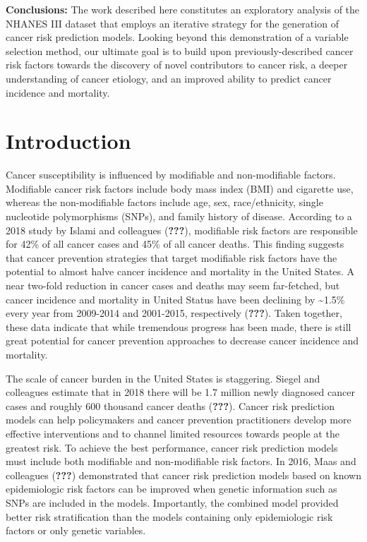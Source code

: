 \documentclass[12pt,twoside]{reedthesis}
\theoremstyle{definition}
\theoremstyle{definition}
\theoremstyle{definition}
\theoremstyle{remark}
\begin{document}
\textbf{Conclusions:} The work described here constitutes an exploratory
analysis of the NHANES III dataset that employs an iterative strategy
for the generation of cancer risk prediction models. Looking beyond this
demonstration of a variable selection method, our ultimate goal is to
build upon previously-described cancer risk factors towards the
discovery of novel contributors to cancer risk, a deeper understanding
of cancer etiology, and an improved ability to predict cancer incidence
and mortality.

\hypertarget{introduction}{%
\section{Introduction}\label{introduction}}

Cancer susceptibility is influenced by modifiable and non-modifiable
factors. Modifiable cancer risk factors include body mass index (BMI)
and cigarette use, whereas the non-modifiable factors include age, sex,
race/ethnicity, single nucleotide polymorphisms (SNPs), and family
history of disease. According to a 2018 study by Islami and colleagues
({\textbf{???}}), modifiable risk factors are responsible for 42\% of
all cancer cases and 45\% of all cancer deaths. This finding suggests
that cancer prevention strategies that target modifiable risk factors
have the potential to almost halve cancer incidence and mortality in the
United States. A near two-fold reduction in cancer cases and deaths may
seem far-fetched, but cancer incidence and mortality in United Status
have been declining by \textasciitilde{}1.5\% every year from 2009-2014
and 2001-2015, respectively ({\textbf{???}}). Taken together, these data
indicate that while tremendous progress has been made, there is still
great potential for cancer prevention approaches to decrease cancer
incidence and mortality.

The scale of cancer burden in the United States is staggering. Siegel
and colleagues estimate that in 2018 there will be 1.7 million newly
diagnosed cancer cases and roughly 600 thousand cancer deaths
({\textbf{???}}). Cancer risk prediction models can help policymakers
and cancer prevention practitioners develop more effective interventions
and to channel limited resources towards people at the greatest risk. To
achieve the best performance, cancer risk prediction models must include
both modifiable and non-modifiable risk factors. In 2016, Maas and
colleagues ({\textbf{???}}) demonstrated that cancer risk prediction
models based on known epidemiologic risk factors can be improved when
genetic information such as SNPs are included in the models.
Importantly, the combined model provided better risk stratification than
the models containing only epidemiologic risk factors or only genetic
variables.
\end{document}
